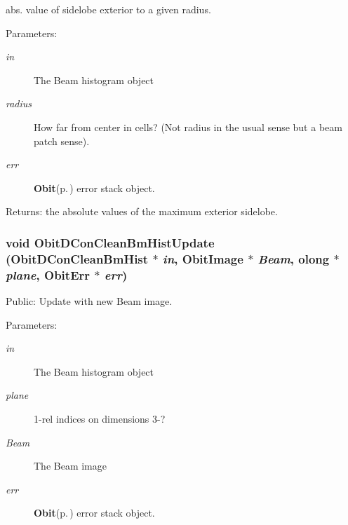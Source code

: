 abs. value of sidelobe exterior to a given radius. \begin{Desc}
\item[Parameters:]
\begin{description}
\item[{\em in}]The Beam histogram object \item[{\em radius}]How far from center in cells? (Not radius in the usual sense but a beam patch sense). \item[{\em err}]{\bf Obit}{\rm (p.\,\pageref{structObit})} error stack object. \end{description}
\end{Desc}
\begin{Desc}
\item[Returns:]the absolute values of the maximum exterior sidelobe. \end{Desc}
\subsubsection{\setlength{\rightskip}{0pt plus 5cm}void Obit\-DCon\-Clean\-Bm\-Hist\-Update ({\bf Obit\-DCon\-Clean\-Bm\-Hist} $\ast$ {\em in}, {\bf Obit\-Image} $\ast$ {\em Beam}, {\bf olong} $\ast$ {\em plane}, {\bf Obit\-Err} $\ast$ {\em err})}\label{ObitDConCleanBmHist_8h_a9}


Public: Update with new Beam image. 

\begin{Desc}
\item[Parameters:]
\begin{description}
\item[{\em in}]The Beam histogram object \item[{\em plane}]1-rel indices on dimensions 3-? \item[{\em Beam}]The Beam image \item[{\em err}]{\bf Obit}{\rm (p.\,\pageref{structObit})} error stack object. \end{description}
\end{Desc}
